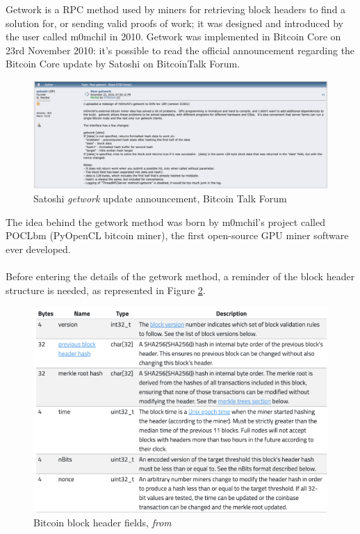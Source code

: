 Getwork is a RPC method used by miners for retrieving block headers to find a solution for, or sending valid proofs of work; it was designed and introduced by the user called m0mchil in 2010.\cite{m0mchilbitcoingetwork}
Getwork was implemented in Bitcoin Core on 23rd November 2010: it's possible to read the official announcement regarding the Bitcoin Core update by Satoshi on BitcoinTalk Forum. \cite{bitcointalkGetwork}

\begin{figure}[h!]
    \centering
    \includegraphics[width=15cm]{Figures/getwork/getwork1.png}
    \caption{Satoshi \textit{getwork} update announcement, Bitcoin Talk Forum}
    \label{fig:getwork1}
\end{figure}

\noindent The idea behind the getwork method was born by m0mchil's project called POCLbm (PyOpenCL bitcoin miner), the first open-source GPU miner software ever developed. \cite{m0mchilpoclbm}\\\\
Before entering the details of the getwork method, a reminder of the block header structure is needed, as represented in Figure \ref{fig:getwork2}.  

\begin{figure}[h!]
    \centering
    \includegraphics[width=15cm]{Figures/getwork/getwork2.png}
    \caption{Bitcoin block header fields, \textit{from \cite{bitcoinblockheader}}}
    \label{fig:getwork2}
\end{figure}

